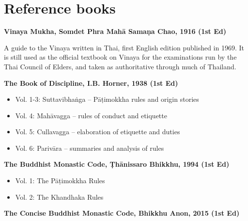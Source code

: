 \clearpage

\section{Reference books}

\textbf{Vinaya Mukha, Somdet Phra Mahā Samaṇa Chao, 1916 (1st Ed)}

A guide to the Vinaya written in Thai, first English edition published
in 1969. It is still used as the official textbook on Vinaya for the
examinations run by the Thai Council of Elders, and taken as
authoritative through much of Thailand.

\textbf{The Book of Discipline, I.B. Horner, 1938 (1st Ed)}

\begin{itemize}
\tightlist
\item
  Vol. 1-3: Suttavibhaṅga -- Pāṭimokkha rules and origin stories
\item
  Vol. 4: Mahāvagga -- rules of conduct and etiquette
\item
  Vol. 5: Cullavagga -- elaboration of etiquette and duties
\item
  Vol. 6: Parivāra -- summaries and analysis of rules
\end{itemize}

\textbf{The Buddhist Monastic Code, Ṭhānissaro Bhikkhu, 1994 (1st Ed)}

\begin{itemize}
\tightlist
\item
  Vol. 1: The Pāṭimokkha Rules
\item
  Vol. 2: The Khandhaka Rules
\end{itemize}

\textbf{The Concise Buddhist Monastic Code, Bhikkhu Anon, 2015 (1st Ed)}

